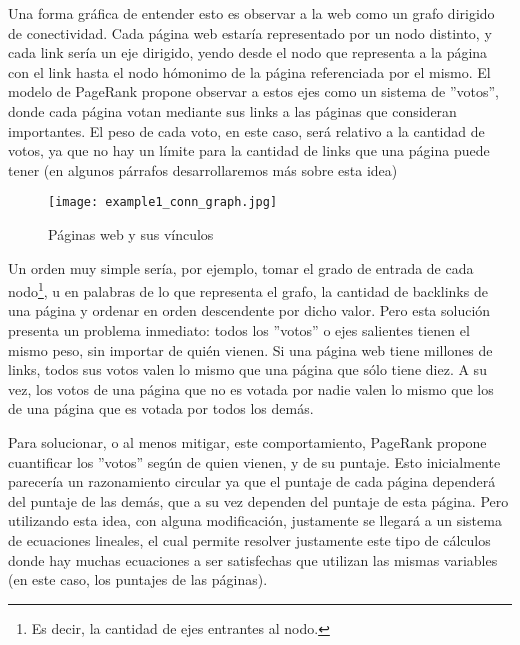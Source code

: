 \par Una forma gr\'afica de entender esto es observar a la web como un grafo
dirigido de conectividad. Cada p\'agina web estar\'ia representado por un nodo
distinto, y cada link ser\'ia un eje dirigido, yendo desde el nodo que
representa a la p\'agina con el link hasta el nodo h\'omonimo de la p\'agina
referenciada por el mismo. El modelo de PageRank propone observar a estos ejes
como un sistema de ''votos'', donde cada p\'agina votan mediante sus links a las
p\'aginas que consideran importantes. El peso de cada voto, en este caso, ser\'a
relativo a la cantidad de votos, ya que no hay un l\'imite para la cantidad de
links que una p\'agina puede tener (en algunos p\'arrafos desarrollaremos m\'as
sobre esta idea)

\begin{wrapfigure}[22]{r}{0.52\textwidth}
    \texttt{[image: example1\_conn\_graph.jpg]}
    \caption{P\'aginas web y sus v\'inculos~\cite{uchicago_research}}
\end{wrapfigure}
\noindent

\par Un orden muy simple ser\'ia, por ejemplo, tomar el grado de entrada de cada
nodo\footnote{Es decir, la cantidad de ejes entrantes al nodo.}, u en palabras
de lo que representa el grafo, la cantidad de backlinks de una p\'agina y
ordenar en orden descendente por dicho valor. Pero esta soluci\'on presenta
un problema inmediato: todos los ''votos'' o ejes salientes tienen el mismo
peso, sin importar de qui\'en vienen. Si una p\'agina web tiene millones de
links, todos sus votos valen lo mismo que una p\'agina que s\'olo tiene diez. A
su vez, los votos de una p\'agina que no es votada por nadie valen lo mismo que
los de una p\'agina que es votada por todos los dem\'as.

\par Para solucionar, o al menos mitigar, este comportamiento, PageRank propone
cuantificar los ''votos'' seg\'un de quien vienen, y de su puntaje. Esto
inicialmente parecer\'ia un razonamiento circular ya que el puntaje de cada
p\'agina depender\'a del puntaje de las dem\'as, que a su vez dependen del
puntaje de esta p\'agina. Pero utilizando esta idea, con alguna modificaci\'on,
justamente se llegar\'a a un sistema de ecuaciones lineales, el cual permite
resolver justamente este tipo de c\'alculos donde hay muchas ecuaciones a ser
satisfechas que utilizan las mismas variables (en este caso, los puntajes de las
p\'aginas).

